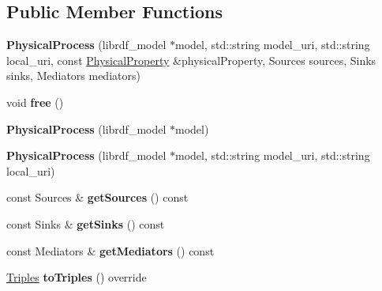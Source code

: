\subsection*{Public Member Functions}
\begin{DoxyCompactItemize}
\item 
\mbox{\label{classomexmeta_1_1PhysicalProcess_a37f99033da4635ff1af2b9f19c1b84ce}} 
{\bfseries Physical\+Process} (librdf\+\_\+model $\ast$model, std\+::string model\+\_\+uri, std\+::string local\+\_\+uri, const \hyperlink{classomexmeta_1_1PhysicalProperty}{Physical\+Property} \&physical\+Property, Sources sources, Sinks sinks, Mediators mediators)
\item 
\mbox{\label{classomexmeta_1_1PhysicalProcess_a8dfcffe80f264ad24e70de9d7b71c73b}} 
void {\bfseries free} ()
\item 
\mbox{\label{classomexmeta_1_1PhysicalProcess_a2b694395a318335e81c884ed76b5f4dd}} 
{\bfseries Physical\+Process} (librdf\+\_\+model $\ast$model)
\item 
\mbox{\label{classomexmeta_1_1PhysicalProcess_a974e2717dbf4b690b95b07e9c026fd2a}} 
{\bfseries Physical\+Process} (librdf\+\_\+model $\ast$model, std\+::string model\+\_\+uri, std\+::string local\+\_\+uri)
\item 
\mbox{\label{classomexmeta_1_1PhysicalProcess_ab5f3100febc21173775a2090bb57a0fb}} 
const Sources \& {\bfseries get\+Sources} () const
\item 
\mbox{\label{classomexmeta_1_1PhysicalProcess_a069e7caa05f346f90f413f650f081535}} 
const Sinks \& {\bfseries get\+Sinks} () const
\item 
\mbox{\label{classomexmeta_1_1PhysicalProcess_a349b76ad1831d2510904510583f0d7f2}} 
const Mediators \& {\bfseries get\+Mediators} () const
\item 
\mbox{\label{classomexmeta_1_1PhysicalProcess_ab6f6af00fac2401f9a88e186fd1d897a}} 
\hyperlink{classomexmeta_1_1Triples}{Triples} {\bfseries to\+Triples} () override

\end{DoxyCompactItemize}
